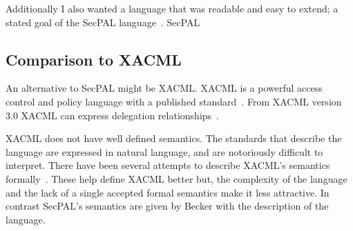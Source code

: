 \documentclass[thesis.tex]{subfiles}
\begin{document}
Additionally I also wanted a language that was readable and easy to extend; a stated goal of the SecPAL language~\cite{becker_secpal:_2010}.
SecPAL 

\subsection{Comparison to XACML}

An alternative to SecPAL might be XACML.
XACML is a powerful access control and policy language with a published standard~\cite{oasis_extensible_2013}.
From XACML version 3.0 XACML can express delegation relationships~\cite{oasis_xacml_2010}.

XACML does not have well defined semantics.
The standards that describe the language are expressed in natural language, and are notoriously difficult to interpret.
There have been several attempts to describe XACML's semantics formally~\cite{ramli_xacml_2012,ramli_logic_2014,bryans_reasoning_2005}.
These help define XACML better but, the complexity of the language and the lack of a single accepted formal semantics make it less attractive.
In contrast SecPAL's semantics are given by Becker with the description of the language.
\end{document}
